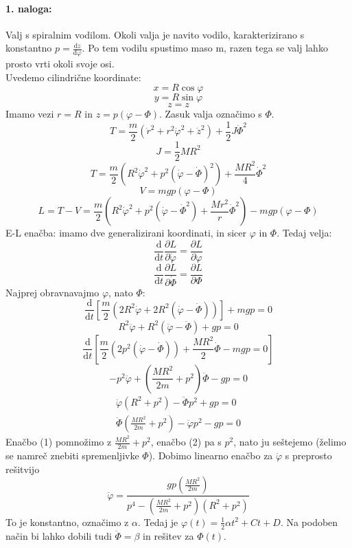 \documentclass[a4paper]{article}
\newcommand{\pd}[2]{\frac{\partial {#1}}{\partial {#2}}}
\newcommand{\dd}[2]{\frac{\mathrm{d} {#1}}{\mathrm{d} {#2}}}
\begin{document}
\paragraph{1. naloga:} Valj s spiralnim vodilom. Okoli valja je navito vodilo, karakterizirano s konstantno $p = \dd{z}{\varphi}$.
Po tem vodilu spustimo maso m, razen tega se valj lahko prosto vrti okoli svoje osi. \\[4mm]
Uvedemo cilindrične koordinate:
$$x = R\cos\varphi$$
$$y = R\sin\varphi$$
$$z = z$$
Imamo vezi $r=R$ in $z=p(\varphi - \Phi)$. Zasuk valja označimo s $\Phi$.
$$T = \frac{m}{2}\left(\dot{r}^2 + r^2\dot{\varphi}^2+\dot{z}^2\right) + \frac{1}{2}J\dot{\Phi}^2$$
$$J = \frac{1}{2}MR^2$$
$$T = \frac{m}{2}\left(R^2\dot{\varphi}^2 + p^2(\dot{\varphi} - \dot{\Phi})^2\right) + \frac{MR^2}{4}\dot{\Phi}^2$$
$$V = mgp(\varphi - \Phi)$$
$$L = T - V = \frac{m}{2}\left(R^2\dot{\varphi}^2 + p^2(\dot{\varphi} - \dot\Phi^2) + \frac{Mr^2}{r}\dot\Phi^2\right) - mgp(\varphi - \Phi)$$
E-L enačba: imamo dve generalizirani koordinati, in sicer $\varphi$ in $\Phi$. Tedaj velja:
$$\dd{}{t}\pd{L}{\dot{\varphi}} = \pd{L}{\varphi}$$
$$\dd{}{t}\pd{L}{\dot{\Phi}} = \pd{L}{\Phi}$$
Najprej obravnavajmo $\varphi$, nato $\Phi$:
$$\dd{}{t} \left[\frac{m}{2}\left(2R^2\dot{\varphi} + 2R^2(\dot\varphi - \dot\Phi)\right)\right] + mgp = 0$$
$$R^2\ddot\varphi + R^2(\ddot\varphi - \ddot\Phi) + gp = 0$$
$$\dd{}{t} \left[\frac{m}{2} \left(2p^2(\dot{\varphi} - \dot{\Phi})\right) + \frac{MR^2}{2}\dot\Phi - mgp = 0\right]$$
$$-p^2\ddot\varphi + \left(\frac{MR^2}{2m} + p^2\right)\ddot\Phi - gp = 0$$
\begin{eqnarray}
    \ddot\varphi \left(R^2 + p^2\right) - \ddot\Phi p^2 + gp = 0 \\
    \ddot\Phi \left(\frac{MR^2}{2m} + p^2\right) - \ddot\varphi p^2 - gp = 0
\end{eqnarray}
Enačbo (1) pomnožimo z $\displaystyle{\frac{MR^2}{2m} + p^2}$, enačbo (2) pa s $p^2$, nato ju seštejemo (želimo se namreč znebiti spremenljivke $\Phi$). Dobimo linearno enačbo za $\ddot\varphi$ s preprosto rešitvijo
$$\ddot\varphi = \frac{gp\left(\frac{MR^2}{2m}\right)}{p^4 - \left(\frac{MR^2}{2m} + p^2\right)\left(R^2 + p^2\right)}$$
To je konstantno, označimo z $\alpha$. Tedaj je $\displaystyle{\varphi(t) = \frac{1}{2}\alpha t^2 + Ct + D}$. Na podoben način bi lahko dobili tudi $\ddot\Phi = \beta$ in rešitev za $\Phi(t)$.
\end{document}
